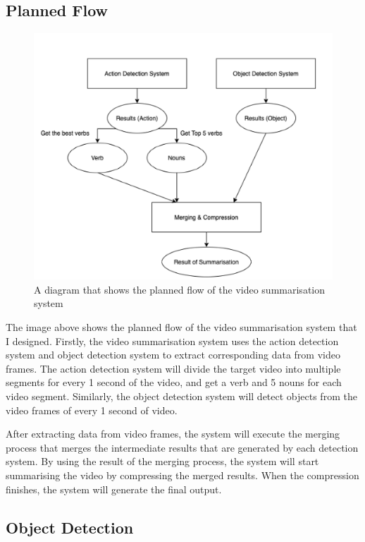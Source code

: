 \documentclass{article}
\begin{document}
\subsection{Planned Flow}

\begin{figure}[H]
    \centering
    \includegraphics[scale=0.4]{imgs/PlannedFlow.png}
    \caption{A diagram that shows the planned flow of the video summarisation system}
    \label{fig:planned_flow}
\end{figure}

The image above shows the planned flow of the video summarisation system that I designed. Firstly, the video summarisation system uses the action detection system and object detection system to extract corresponding data from video frames. The action detection system will divide the target video into multiple segments for every 1 second of the video, and get a verb and 5 nouns for each video segment. Similarly, the object detection system will detect objects from the video frames of every 1 second of video.

After extracting data from video frames, the system will execute the merging process that merges the intermediate results that are generated by each detection system. By using the result of the merging process, the system will start summarising the video by compressing the merged results. When the compression finishes, the system will generate the final output.

\subsection{Object Detection}
\end{document}
